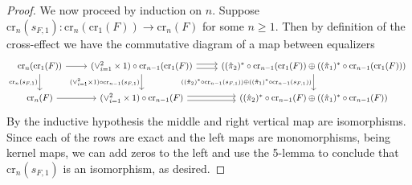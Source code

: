\begin{proof}
    We now proceed by induction on $n$. Suppose $\text{cr}_n(s_{F,1}):\text{cr}_n(\text{cr}_1(F))\to \text{cr}_n(F)$ for some $n \geq 1$. Then by definition of the cross-effect we have the commutative diagram of a map between equalizers
    \[\begin{tikzcd}
        {\text{cr}_n(\text{cr}_1(F))} & {(\lor_{i=1}^2\times 1)\circ \text{cr}_{n-1}(\text{cr}_1(F))} & {((\hat{\pi}_2)^*\circ \text{cr}_{n-1}(\text{cr}_1(F))\oplus ((\hat{\pi}_1)^*\circ \text{cr}_{n-1}(\text{cr}_1(F)))} \\
        {\text{cr}_n(F)} & {(\lor_{i=1}^2\times 1)\circ \text{cr}_{n-1}(F)} & {((\hat{\pi}_2)^*\circ \text{cr}_{n-1}(F)\oplus ((\hat{\pi}_1)^*\circ \text{cr}_{n-1}(F))}
        \arrow["{\text{cr}_n(s_{F,1})}"', from=1-1, to=2-1]
        \arrow[from=1-1, to=1-2]
        \arrow[shift left, from=1-2, to=1-3]
        \arrow[from=2-1, to=2-2]
        \arrow[shift left, from=2-2, to=2-3]
        \arrow[shift right, from=2-2, to=2-3]
        \arrow[shift right, from=1-2, to=1-3]
        \arrow["{(\lor_{i=1}^2\times 1)\circ \text{cr}_{n-1}(s_{F,1})}"', from=1-2, to=2-2]
        \arrow["{((\hat{\pi}_2)^*\circ \text{cr}_{n-1}(s_{F,1}))\oplus ((\hat{\pi}_1)^*\circ \text{cr}_{n-1}(s_{F,1}))}"', from=1-3, to=2-3]
    \end{tikzcd}\]
    By the inductive hypothesis the middle and right vertical map are isomorphisms. Since each of the rows are exact and the left maps are monomorphisms, being kernel maps, we can add zeros to the left and use the 5-lemma to conclude that $\text{cr}_n(s_{F,1})$ is an isomorphism, as desired.

\end{proof}
